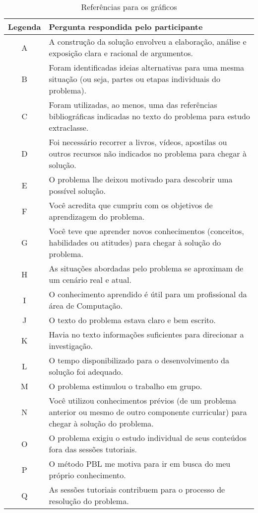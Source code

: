 \begin{table}[h]
\caption{Referências para os gráficos}
\label{tabela-ref-graficos}
\begin{tabular}{c|p{14.6cm}}
Legenda & Pergunta respondida pelo participante \\
\hline
A & A construção da solução envolveu a elaboração, análise e exposição clara e racional de argumentos.\\
\hline
B & Foram identificadas ideias alternativas para uma mesma situação (ou seja, partes ou etapas individuais do problema).\\
\hline
C & Foram utilizadas, ao menos, uma das referências bibliográficas indicadas no texto do problema para estudo extraclasse.\\
\hline
D & Foi necessário recorrer a livros, vídeos, apostilas ou outros recursos não indicados no problema para chegar à solução.\\
\hline
E & O problema lhe deixou motivado para descobrir uma possível solução.\\
\hline
F & Você acredita que cumpriu com os objetivos de aprendizagem do problema.\\
\hline
G & Você teve que aprender novos conhecimentos (conceitos, habilidades ou atitudes) para chegar à solução do problema.\\
\hline
H & As situações abordadas pelo problema se aproximam de um cenário real e atual.\\
\hline
I & O conhecimento aprendido é útil para um profissional da área de Computação.\\
\hline
J & O texto do problema estava claro e bem escrito.\\
\hline
K & Havia no texto informações suficientes para direcionar a investigação.\\
\hline
L & O tempo disponibilizado para o desenvolvimento da solução foi adequado.\\
\hline
M & O problema estimulou o trabalho em grupo.\\
\hline
N & Você utilizou conhecimentos prévios (de um problema anterior ou mesmo de outro componente curricular) para chegar à solução do problema.\\
\hline
O & O problema exigiu o estudo individual de seus conteúdos fora das sessões tutoriais.\\
\hline
P & O método PBL me motiva para ir em busca do meu próprio conhecimento.\\
\hline
Q & As sessões tutoriais contribuem para o processo de resolução do problema.\\

\end{tabular}
\end{table}
